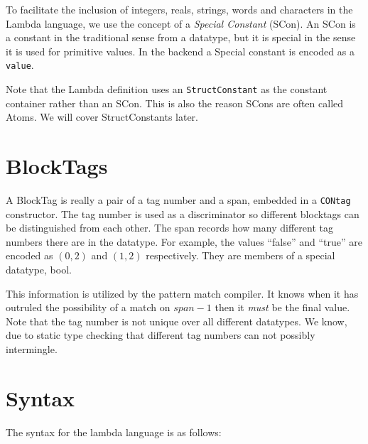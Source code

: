\documentclass[a4paper, oneside, 10pt, draft]{memoir}
\begin{document}
To facilitate the inclusion of integers, reals, strings, words and
characters in the Lambda language, we use the concept of a
\emph{Special Constant} (SCon). An SCon is a constant in the
traditional sense from a datatype, but it is special in the sense it
is used for primitive values. In the backend a Special constant
is encoded as a \texttt{value}.

Note that the Lambda definition uses an \texttt{StructConstant} as the
constant container rather than an SCon. This is also the reason SCons
are often called Atoms. We will cover StructConstants
later.

\section{BlockTags}

A BlockTag is really a pair of a tag number and a span, embedded in a
\texttt{CONtag} constructor. The tag number is used as a discriminator
so different blocktags can be distinguished from each other. The span
records how many different tag numbers there are in the datatype. For
example, the values ``false'' and ``true'' are encoded as $(0,2)$ and
$(1,2)$ respectively. They are members of a special datatype, bool.

This information is utilized by the pattern match compiler. It knows
when it has outruled the possibility of a match on $span-1$ then it
\emph{must} be the final value. Note that the tag number is not unique
over all different datatypes. We know, due to static type checking
that different tag numbers can not possibly intermingle.

\section{Syntax}

The syntax for the lambda language is as follows:
\end{document}

